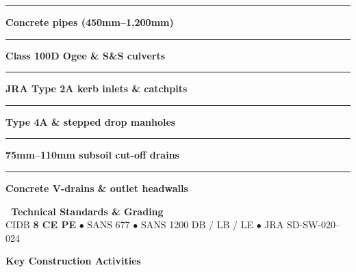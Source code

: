\documentclass[a4paper,11pt]{article}
\begin{document}
\begin{minipage}[t]{0.34\textwidth}
    \vspace{0pt}
    \begin{tcolorbox}[
        enhanced, colback=mhoffwhite, colframe=mhnavy, boxrule=0.9pt, arc=4pt,
        title={\bfseries\color{white}\faWater\ Scope of Work},
        colbacktitle=mhnavy, left=7pt, right=7pt, top=5pt, bottom=5pt, drop shadow=black!5
    ]
        \fontsize{7.8pt}{10.8pt}\selectfont
        \textcolor{mhnavy}{\rule{3.5pt}{3.5pt}}\hspace{4pt}\textbf{Concrete pipes (450mm--1,200mm)}\\
        \textcolor{mhnavy}{\rule{3.5pt}{3.5pt}}\hspace{4pt}\textbf{Class 100D Ogee \& S\&S culverts}\\
        \textcolor{mhnavy}{\rule{3.5pt}{3.5pt}}\hspace{4pt}\textbf{JRA Type 2A kerb inlets \& catchpits}\\
        \textcolor{mhnavy}{\rule{3.5pt}{3.5pt}}\hspace{4pt}\textbf{Type 4A \& stepped drop manholes}\\
        \textcolor{mhnavy}{\rule{3.5pt}{3.5pt}}\hspace{4pt}\textbf{75mm--110mm subsoil cut-off drains}\\
        \textcolor{mhnavy}{\rule{3.5pt}{3.5pt}}\hspace{4pt}\textbf{Concrete V-drains \& outlet headwalls}
    \end{tcolorbox}

    \vspace{0.12cm}

    \begin{tcolorbox}[
        enhanced, colback=white, colframe=mhlightgray, boxrule=0.8pt, arc=4pt,
        left=6pt, right=6pt, top=5pt, bottom=5pt, drop shadow=black!3
    ]
        {\fontsize{7.5pt}{9.6pt}\selectfont\bfseries\color{mhnavy}\faCheckDouble\ Technical Standards \& Grading}\\[2pt]
        {\fontsize{7.3pt}{9.4pt}\selectfont\color{mhtextmuted}
        CIDB \textbf{8 CE PE} $\bullet$ SANS 677 $\bullet$ SANS 1200 DB / LB / LE $\bullet$ JRA SD-SW-020--024}
    \end{tcolorbox}
\end{minipage}

\vfill

{\large\bfseries\color{mhnavy} Key Construction Activities}
\vspace{0.10cm}
\end{document}
